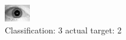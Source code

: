 \begin{figure}[h!]
\begin{center}
\includegraphics[width=0.60\columnwidth]{figures/ID1766_class_3_target_2.png}
\end{center}
\caption{ Classification: 3 actual target: 2}
\label{fig:ID1766_class_3_target_2}
\end{figure}
